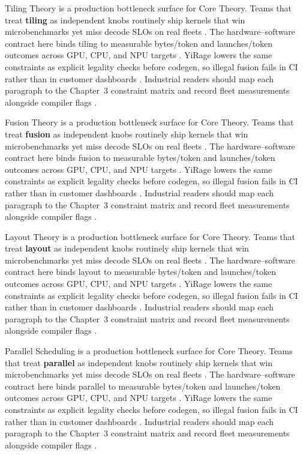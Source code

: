 Tiling Theory is a production bottleneck surface for Core Theory. Teams that treat \textbf{tiling} as independent knobs routinely ship kernels that win microbenchmarks yet miss decode SLOs on real fleets \citep{memoryfloor2026,amd2024xdna}. The hardware--software contract here binds tiling to measurable bytes/token and launches/token outcomes across GPU, CPU, and NPU targets \citep{nvidia2022hopper,amd2024aie}. YiRage lowers the same constraints as explicit legality checks before codegen, so illegal fusion fails in CI rather than in customer dashboards \citep{semianalysis2024tma,dlbook}. Industrial readers should map each paragraph to the Chapter~3 constraint matrix and record fleet measurements alongside compiler flags \citep{amd2024xdna,dao2022flashattention}.

Fusion Theory is a production bottleneck surface for Core Theory. Teams that treat \textbf{fusion} as independent knobs routinely ship kernels that win microbenchmarks yet miss decode SLOs on real fleets \citep{nvidia2022hopper,amd2024aie}. The hardware--software contract here binds fusion to measurable bytes/token and launches/token outcomes across GPU, CPU, and NPU targets \citep{semianalysis2024tma,dlbook}. YiRage lowers the same constraints as explicit legality checks before codegen, so illegal fusion fails in CI rather than in customer dashboards \citep{amd2024xdna,dao2022flashattention}. Industrial readers should map each paragraph to the Chapter~3 constraint matrix and record fleet measurements alongside compiler flags \citep{amd2024aie,kwon2023vllm}.

Layout Theory is a production bottleneck surface for Core Theory. Teams that treat \textbf{layout} as independent knobs routinely ship kernels that win microbenchmarks yet miss decode SLOs on real fleets \citep{semianalysis2024tma,dlbook}. The hardware--software contract here binds layout to measurable bytes/token and launches/token outcomes across GPU, CPU, and NPU targets \citep{amd2024xdna,dao2022flashattention}. YiRage lowers the same constraints as explicit legality checks before codegen, so illegal fusion fails in CI rather than in customer dashboards \citep{amd2024aie,kwon2023vllm}. Industrial readers should map each paragraph to the Chapter~3 constraint matrix and record fleet measurements alongside compiler flags \citep{dlbook,nvidia2024cudagraphs}.

Parallel Scheduling is a production bottleneck surface for Core Theory. Teams that treat \textbf{parallel} as independent knobs routinely ship kernels that win microbenchmarks yet miss decode SLOs on real fleets \citep{amd2024xdna,dao2022flashattention}. The hardware--software contract here binds parallel to measurable bytes/token and launches/token outcomes across GPU, CPU, and NPU targets \citep{amd2024aie,kwon2023vllm}. YiRage lowers the same constraints as explicit legality checks before codegen, so illegal fusion fails in CI rather than in customer dashboards \citep{dlbook,nvidia2024cudagraphs}. Industrial readers should map each paragraph to the Chapter~3 constraint matrix and record fleet measurements alongside compiler flags \citep{dao2022flashattention,liu2024deepseekv3}.

